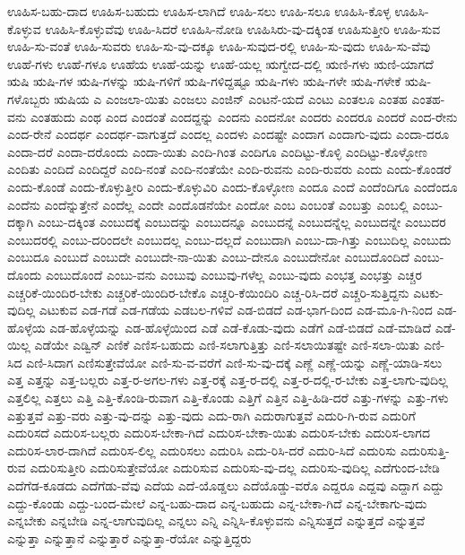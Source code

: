 {ಊಹಿಸ-ಬಹು-ದಾದ
ಊಹಿಸ-ಬಹುದು
ಊಹಿಸ-ಲಾಗಿದೆ
ಊಹಿ-ಸಲು
ಊಹಿ-ಸಲೂ
ಊಹಿಸಿ-ಕೊಳ್ಳ
ಊಹಿಸಿ-ಕೊಳ್ಳುವ
ಊಹಿಸಿ-ಕೊಳ್ಳುವೆವು
ಊಹಿ-ಸಿದರೆ
ಊಹಿಸಿ-ನೋಡಿ
ಊಹಿಸಿರು-ವು-ದಕ್ಕಿಂತ
ಊಹಿಸುತ್ತೀರಿ
ಊಹಿ-ಸುವ
ಊಹಿ-ಸು-ವಂತೆ
ಊಹಿ-ಸುವರು
ಊಹಿ-ಸು-ವು-ದಕ್ಕೂ
ಊಹಿ-ಸುವುದ-ರಲ್ಲಿ
ಊಹಿ-ಸು-ವುದು
ಊಹಿ-ಸು-ವೆವು
ಊಹೆ-ಗಳು
ಊಹೆ-ಗಳೂ
ಊಹೆಯ
ಊಹೆ-ಯನ್ನು
ಊಹೆ-ಯಲ್ಲ
ಋಗ್ವೇದ-ದಲ್ಲಿ
ಋಣಿ-ಗಳು
ಋಣಿ-ಯಾಗದೆ
ಋಷಿ
ಋಷಿ-ಗಳ
ಋಷಿ-ಗಳನ್ನು
ಋಷಿ-ಗಳಿಗೆ
ಋಷಿ-ಗಳಿದ್ದಷ್ಟೂ
ಋಷಿ-ಗಳು
ಋಷಿ-ಗಳೇ
ಋಷಿ-ಗಳೇಕೆ
ಋಷಿ-ಗಳೊಬ್ಬರು
ಋಷಿಯ
ಎ
ಎಂಜಲಾ-ಯಿತು
ಎಂಜಲು
ಎಂಜಿನ್
ಎಂಟನೆ-ಯದೆ
ಎಂಟು
ಎಂತಲೂ
ಎಂತಹ
ಎಂತಹ-ವನು
ಎಂತಹುದು
ಎಂಥ
ಎಂದ
ಎಂದಂತೆ
ಎಂದದ್ದನ್ನು
ಎಂದನು
ಎಂದನೋ
ಎಂದರು
ಎಂದರೂ
ಎಂದರೆ
ಎಂದ-ರೇನು
ಎಂದ-ರೇನೆ
ಎಂದರ್ಥ
ಎಂದರ್ಥ-ವಾಗುತ್ತದೆ
ಎಂದಲ್ಲ
ಎಂದಳು
ಎಂದಷ್ಟೇ
ಎಂದಾಗ
ಎಂದಾಗು-ವುದು
ಎಂದಾ-ದರೂ
ಎಂದಾ-ದರೆ
ಎಂದಾ-ದರೊಂದು
ಎಂದಾ-ಯಿತು
ಎಂದಿ-ಗಿಂತ
ಎಂದಿಗೂ
ಎಂದಿಟ್ಟು-ಕೊಳ್ಳಿ
ಎಂದಿಟ್ಟು-ಕೊಳ್ಳೋಣ
ಎಂದಿತು
ಎಂದಿದೆ
ಎಂದಿದ್ದರೆ
ಎಂದಿ-ನಂತೆ
ಎಂದಿ-ನಂತೆಯೇ
ಎಂದಿ-ರುವನು
ಎಂದಿ-ರುವರು
ಎಂದು
ಎಂದು-ಕೊಂಡರೆ
ಎಂದು-ಕೊಂಡೆ
ಎಂದು-ಕೊಳ್ಳುತ್ತೀರಿ
ಎಂದು-ಕೊಳ್ಳುವಿರಿ
ಎಂದು-ಕೊಳ್ಳೋಣ
ಎಂದೂ
ಎಂದೆ
ಎಂದೆಂದಿಗೂ
ಎಂದೆಂದೂ
ಎಂದೆನು
ಎಂದೆನ್ನುತ್ತೇನೆ
ಎಂದೆಲ್ಲ
ಎಂದೇ
ಎಂದೊಡನೆಯೇ
ಎಂದೋ
ಎಂಬ
ಎಂಬಂತೆ
ಎಂಬತ್ತು
ಎಂಬಲ್ಲಿ
ಎಂಬು-ದಕ್ಕಾಗಿ
ಎಂಬು-ದಕ್ಕಿಂತ
ಎಂಬುದಕ್ಕೆ
ಎಂಬುದನ್ನು
ಎಂಬುದನ್ನೂ
ಎಂಬುದನ್ನೆ
ಎಂಬುದನ್ನೆಲ್ಲ
ಎಂಬುದನ್ನೇ
ಎಂಬುದರ
ಎಂಬುದರಲ್ಲಿ
ಎಂಬು-ದರಿಂದಲೇ
ಎಂಬುದಲ್ಲ
ಎಂಬು-ದಲ್ಲದೆ
ಎಂಬುದಾಗಿ
ಎಂಬು-ದಾ-ಗಿತ್ತು
ಎಂಬುದಿಲ್ಲ
ಎಂಬುದು
ಎಂಬುದೂ
ಎಂಬುದೆ
ಎಂಬುದೇ
ಎಂಬುದೇ-ನಾ-ಯಿತು
ಎಂಬು-ದೇನೂ
ಎಂಬುದೇನೋ
ಎಂಬುದೊಂದಿದೆ
ಎಂಬು-ದೊಂದು
ಎಂಬುದೊಂದೆ
ಎಂಬು-ವನು
ಎಂಬುವು
ಎಂಬುವು-ಗಳೆಲ್ಲ
ಎಂಬು-ವುದು
ಎಂಭತ್ತ
ಎಂಭತ್ತು
ಎಚ್ಚರ
ಎಚ್ಚರಿಕೆ-ಯಿಂದಿರ-ಬೇಕು
ಎಚ್ಚರಿಕೆ-ಯಿಂದಿರ-ಬೇಕೊ
ಎಚ್ಚರಿ-ಕೆಯಿಂದಿರಿ
ಎಚ್ಚ-ರಿಸಿ-ದರೆ
ಎಚ್ಚರಿ-ಸುತ್ತಿದ್ದನು
ಎಟಕು-ವುದಿಲ್ಲ
ಎಟುಕುವ
ಎಡ-ಗಡೆ
ಎಡ-ಗಡೆಯ
ಎಡಬಲ-ಗಳಿವೆ
ಎಡ-ಬಿಡದೆ
ಎಡ-ಭಾಗ-ದಿಂದ
ಎಡ-ಮೂ-ಗಿ-ನಿಂದ
ಎಡ-ಹೊಳ್ಳೆಯ
ಎಡ-ಹೊಳ್ಳೆಯನ್ನು
ಎಡ-ಹೊಳ್ಳೆಯಿಂದ
ಎಡೆ
ಎಡೆ-ಕೊಡು-ವುದು
ಎಡೆಗೆ
ಎಡೆ-ಬಿಡದೆ
ಎಡೆ-ಮಾಡಿದೆ
ಎಡೆ-ಯಿಲ್ಲ
ಎಡೆಯೇ
ಎಡ್ವಿನ್
ಎಣಿಕೆ
ಎಣಿಸ-ಬಹುದು
ಎಣಿ-ಸಲಾಗುತ್ತಿತ್ತು
ಎಣಿ-ಸಲಾಯಿತಷ್ಟೇ
ಎಣಿ-ಸಲಾ-ಯಿತು
ಎಣಿ-ಸಿದ
ಎಣಿ-ಸಿದಾಗ
ಎಣಿಸುತ್ತೇವೆಯೋ
ಎಣಿ-ಸು-ವ-ವರೆಗೆ
ಎಣಿ-ಸು-ವು-ದಕ್ಕೆ
ಎಣ್ಣೆ
ಎಣ್ಣೆ-ಯನ್ನು
ಎಣ್ಣೆ-ಯಾಡಿ-ಸಲು
ಎತ್ತ
ಎತ್ತನ್ನು
ಎತ್ತ-ಬಲ್ಲರು
ಎತ್ತ-ರ-ಅಗಲ-ಗಳು
ಎತ್ತ-ರಕ್ಕೆ
ಎತ್ತ-ರ-ದಲ್ಲಿ
ಎತ್ತ-ರ-ದಲ್ಲಿ-ರ-ಬೇಕು
ಎತ್ತ-ಲಾಗು-ವುದಿಲ್ಲ
ಎತ್ತಲಿಲ್ಲ
ಎತ್ತಲು
ಎತ್ತಿ
ಎತ್ತಿ-ಕೊಂಡಿ-ರುವಾಗ
ಎತ್ತಿ-ಕೊಂಡು
ಎತ್ತಿಗೆ
ಎತ್ತಿನ
ಎತ್ತಿ-ಹಿಡಿ-ದರೆ
ಎತ್ತು-ಗಳನ್ನು
ಎತ್ತು-ಗಳು
ಎತ್ತುತ್ತವೆ
ಎತ್ತು-ವರು
ಎತ್ತು-ವು-ದನ್ನು
ಎತ್ತು-ವುದು
ಎದು-ರಾಗಿ
ಎದುರಾಗುತ್ತವೆ
ಎದುರಿ-ಗಿ-ರುವ
ಎದುರಿಗೆ
ಎದುರಿಸದೆ
ಎದುರಿಸ-ಬಲ್ಲರು
ಎದುರಿಸ-ಬೇಕಾ-ಗಿದೆ
ಎದುರಿಸ-ಬೇಕಾ-ಯಿತು
ಎದುರಿಸ-ಬೇಕು
ಎದುರಿಸ-ಲಾಗದ
ಎದುರಿಸ-ಲಾರ-ದಾಗಿದೆ
ಎದುರಿಸ-ಲಿಲ್ಲ
ಎದುರಿಸಲು
ಎದುರಿಸಿ
ಎದು-ರಿಸಿ-ದರೆ
ಎದುರಿ-ಸಿದೆ
ಎದುರಿಸು
ಎದುರಿಸುತ್ತಿ-ರುವ
ಎದುರಿಸುತ್ತೀರಿ
ಎದುರಿಸುತ್ತೇವೆಯೋ
ಎದುರಿಸುವ
ಎದುರಿಸು-ವು-ದಲ್ಲ
ಎದುರಿಸು-ವುದಿಲ್ಲ
ಎದೆಗುಂದ-ಬೇಡಿ
ಎದೆಗೆಡ-ಕೂಡದು
ಎದೆಗೆಡು-ವೆವು
ಎದೆಯ
ಎದೆ-ಯೊಡ್ಡಲು
ಎದೆಯೊಡ್ಡು-ವರೊ
ಎದ್ದರೂ
ಎದ್ದವು
ಎದ್ದಾಗ
ಎದ್ದು
ಎದ್ದು-ಕೊಂಡು
ಎದ್ದು-ಬಂದ-ಮೇಲೆ
ಎನ್ನ-ಬಹು-ದಾದ
ಎನ್ನ-ಬಹುದು
ಎನ್ನ-ಬೇಕಾ-ಗಿದೆ
ಎನ್ನ-ಬೇಕಾಗು-ವುದು
ಎನ್ನಬೇಕು
ಎನ್ನಬೇಡಿ
ಎನ್ನ-ಲಾಗುವುದಿಲ್ಲ
ಎನ್ನಲು
ಎನ್ನಿ
ಎನ್ನಿಸಿ-ಕೊಳ್ಳುವನು
ಎನ್ನಿಸುತ್ತದೆ
ಎನ್ನುತ್ತದೆ
ಎನ್ನುತ್ತವೆ
ಎನ್ನುತ್ತಾ
ಎನ್ನುತ್ತಾನೆ
ಎನ್ನುತ್ತಾರೆ
ಎನ್ನುತ್ತಾ-ರೆಯೋ
ಎನ್ನುತ್ತಿದ್ದರು
}
